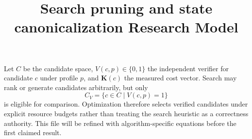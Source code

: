 \documentclass{article}
\title{Search pruning and state canonicalization Research Model}
\begin{document}
\maketitle
Let $C$ be the candidate space, $V(c,p)\in\{0,1\}$ the independent verifier
for candidate $c$ under profile $p$, and $\mathbf{K}(c)$ the measured cost
vector. Search may rank or generate candidates arbitrarily, but only
\[
  C_V = \{c\in C\mid V(c,p)=1\}
\]
is eligible for comparison. Optimization therefore selects verified candidates
under explicit resource budgets rather than treating the search heuristic as a
correctness authority. This file will be refined with algorithm-specific
equations before the first claimed result.
\end{document}
